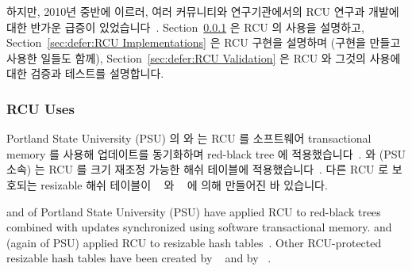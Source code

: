 \fi

하지만, 2010년 중반에 이르러, 여러 커뮤니티와 연구기관에서의 RCU 연구과 개발에
대한 반가운 급증이 있었습니다~\cite{FransKaashoek2015ParallelOSHistory}.
Section~\ref{sec:defer:RCU Uses} 은 RCU 의 사용을 설명하고,
Section~\ref{sec:defer:RCU Implementations} 은 RCU 구현을 설명하며 (구현을
만들고 사용한 일들도 함께),
Section~\ref{sec:defer:RCU Validation} 은 RCU 와 그것의 사용에 대한 검증과
테스트를 설명합니다.

\iffalse

However, in the mid 2010s, there was a welcome upsurge in RCU research
and development across a number of communities and
institutions~\cite{FransKaashoek2015ParallelOSHistory}.
Section~\ref{sec:defer:RCU Uses} describes uses of RCU,
Section~\ref{sec:defer:RCU Implementations} describes RCU implementations
(as well as work that both creates and uses an implementation),
and finally,
Section~\ref{sec:defer:RCU Validation} describes verification and validation
of RCU and its uses.

\fi

\subsubsection{RCU Uses}
\label{sec:defer:RCU Uses}

Portland State University (PSU) 의  와  는
RCU 를 소프트웨어 transactional memory 를 사용해 업데이트를 동기화하며
red-black tree 에 적용했습니다~\cite{PhilHowardPhD,PhilHoward2011RCUTMRBTree}.
 와  (PSU 소속) 는 RCU 를 크기 재조정
가능한 해쉬 테이블에
적용했습니다~\cite{JoshTriplettPhD,Triplett:2011:RPHash,JonCorbet2014RCUhash1,JonCorbet2014RCUhash2}.
다른 RCU 로 보호되는 resizable 해쉬 테이블이
~\cite{HerbertXu2010RCUResizeHash} 와
~\cite{PaulMcKenney2013LWNURCUhash} 에 의해 만들어진 바
있습니다.

\iffalse

 and  of Portland State University
(PSU) have
applied RCU to red-black
trees~\cite{PhilHowardPhD,PhilHoward2011RCUTMRBTree} combined with updates
synchronized using software transactional memory.
 and  (again of PSU)
applied RCU to resizable
hash tables~\cite{JoshTriplettPhD,Triplett:2011:RPHash,JonCorbet2014RCUhash1,JonCorbet2014RCUhash2}.
Other RCU-protected resizable hash tables have been created by
~\cite{HerbertXu2010RCUResizeHash} and by
~\cite{PaulMcKenney2013LWNURCUhash}.


